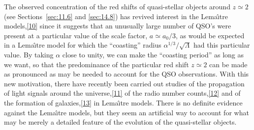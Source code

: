 The observed concentration of the red shifts of quasi-stellar objects around
\(z\simeq2\) (see Sections~\ref{sec:11.6} and \ref{sec:14.8}) has revived
interest in the Lema\^{\i}tre models,\hyperref[ch16-ref-10]{[10]} since it
suggests that an unusually large number of QSO's were present at a particular
value of the scale factor, \(a\simeq a_0/3\), as would be expected in a
Lema\^{\i}tre model for which the ``coasting'' radius
\(\alpha^{1/3}/\sqrt{\Lambda}\) had this particular value. By taking \(\alpha\)
close to unity, we can make the ``coasting period'' as long as we want, so that
the predominance of the particular red shift \(z\simeq2\) can be made as
pronounced as may be needed to account for the QSO observations. With this new
motivation, there have recently been carried out studies of the propagation of
light signals around the universe,\hyperref[ch16-ref-11]{[11]} of the radio
number counts,\hyperref[ch16-ref-12]{[12]} and of the formation of
galaxies,\hyperref[ch16-ref-13]{[13]} in Lema\^{\i}tre models. There is no
definite evidence against the Lema\^{\i}tre models, but they seem an artificial
way to account for what may be merely a detailed feature of the evolution of
the quasi-stellar objects.
